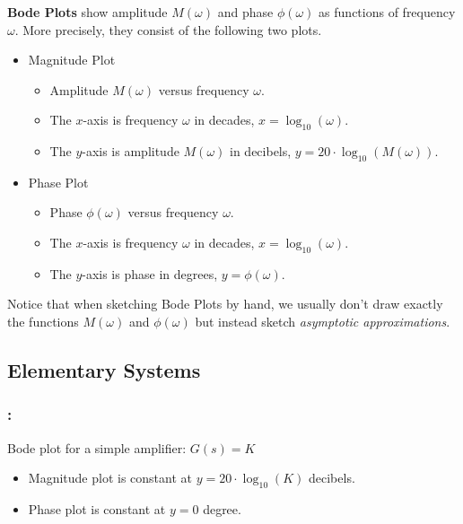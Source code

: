 \documentclass[ 10pt, xcolor = dvipsnames]{beamer}
\begin{document}
\begin{frame}[allowframebreaks]
\frametitle{\insertsection}

\textbf{Bode Plots} show amplitude $M(\omega)$ and phase $\phi(\omega)$ as functions of frequency $\omega$. More precisely, they consist of the following two plots. 
\begin{itemize}
\item Magnitude Plot
\begin{itemize}
\item Amplitude $M(\omega)$ versus frequency $\omega$. 
\item The $x$-axis is frequency $\omega$ in decades, \ie $x = \log_{10}(\omega)$. 
\item The $y$-axis is amplitude $M(\omega)$ in decibels, \ie $y = 20 \cdot \log_{10}(M(\omega))$. 
\end{itemize}
\item Phase Plot
\begin{itemize}
\item Phase $\phi(\omega)$ versus frequency $\omega$. 
\item The $x$-axis is frequency $\omega$ in decades, \ie $x = \log_{10}(\omega)$. 
\item The $y$-axis is phase in degrees, \ie $y = \phi(\omega)$. 
\end{itemize}
\end{itemize}
\halfskip

Notice that when sketching Bode Plots by hand, we usually don't draw exactly \linebreak the functions $M(\omega)$ and $\phi(\omega)$ but instead sketch \emph{asymptotic approximations}. 

\end{frame}

\subsection{Elementary Systems}

\begin{frame}[allowframebreaks]
\frametitle{\insertsection: \insertsubsection}

Bode plot for a simple amplifier: $G(s) = K$
\begin{itemize}
\item Magnitude plot is constant at $y = 20 \cdot \log_{10}(K)$ decibels. 
\item Phase plot is constant at $y = 0$ degree. 
\end{itemize}

\end{frame}
\end{document}

